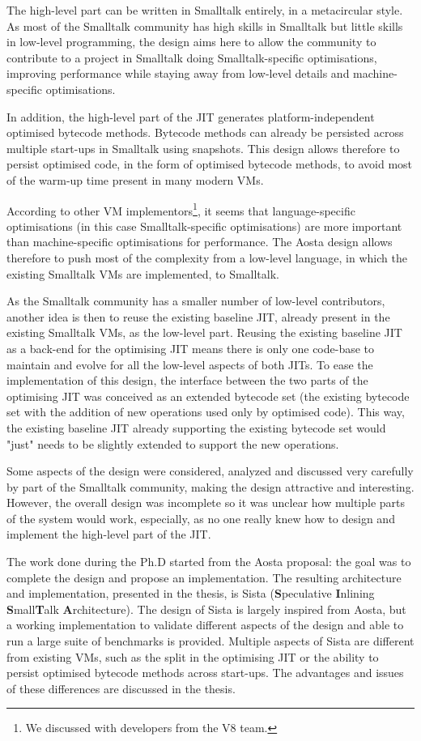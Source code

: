 \documentclass[a4paper,12pt,twoside]{../includes/ThesisStyle}
\begin{document}
The high-level part can be written in Smalltalk entirely, in a metacircular style. As most of the Smalltalk community has high skills in Smalltalk but little skills in low-level programming, the design aims here to allow the community to contribute to a project in Smalltalk doing Smalltalk-specific optimisations, improving performance while staying away from low-level details and machine-specific optimisations. 

In addition, the high-level part of the JIT generates platform-independent optimised bytecode methods. Bytecode methods can already be persisted across multiple start-ups in Smalltalk using snapshots. This design allows therefore to persist optimised code, in the form of optimised bytecode methods, to avoid most of the warm-up time present in many modern VMs.

According to other VM implementors\footnote{We discussed with developers from the V8 team.}, it seems that language-specific optimisations (in this case Smalltalk-specific optimisations) are more important than machine-specific optimisations for performance. The Aosta design allows therefore to push most of the complexity from a low-level language, in which the existing Smalltalk VMs are implemented, to Smalltalk.

As the Smalltalk community has a smaller number of low-level contributors, another idea is then to reuse the existing baseline JIT, already present in the existing Smalltalk VMs, as the low-level part. Reusing the existing baseline JIT as a back-end for the optimising JIT means there is only one code-base to maintain and evolve for all the low-level aspects of both JITs. To ease the implementation of this design, the interface between the two parts of the optimising JIT was conceived as an extended bytecode set (the existing bytecode set with the addition of new operations used only by optimised code). This way, the existing baseline JIT already supporting the existing bytecode set would "just" needs to be slightly extended to support the new operations.

Some aspects of the design were considered, analyzed and discussed very carefully by part of the Smalltalk community, making the design attractive and interesting. However, the overall design was incomplete so it was unclear how multiple parts of the system would work, especially, as no one really knew how to design and implement the high-level part of the JIT.

The work done during the Ph.D started from the Aosta proposal: the goal was to complete the design and propose an implementation. The resulting architecture and implementation, presented in the thesis, is Sista (\textbf{S}peculative \textbf{I}nlining \textbf{S}mall\textbf{T}alk \textbf{A}rchitecture). The design of Sista is largely inspired from Aosta, but a working implementation to validate different aspects of the design and able to run a large suite of benchmarks is provided. Multiple aspects of Sista are different from existing VMs, such as the split in the optimising JIT or the ability to persist optimised bytecode methods across start-ups. The advantages and issues of these differences are discussed in the thesis.
\end{document}
